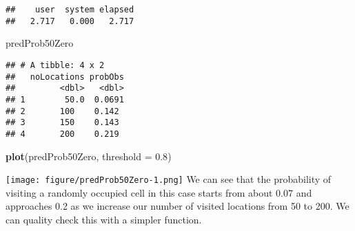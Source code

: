 \documentclass[]{article}
\newenvironment{Shaded}{\begin{snugshade}}{\end{snugshade}}
\newcommand{\KeywordTok}[1]{\textcolor[rgb]{0.13,0.29,0.53}{\textbf{#1}}}
\newcommand{\DataTypeTok}[1]{\textcolor[rgb]{0.13,0.29,0.53}{#1}}
\newcommand{\DecValTok}[1]{\textcolor[rgb]{0.00,0.00,0.81}{#1}}
\newcommand{\FloatTok}[1]{\textcolor[rgb]{0.00,0.00,0.81}{#1}}
\newcommand{\StringTok}[1]{\textcolor[rgb]{0.31,0.60,0.02}{#1}}
\newcommand{\CommentTok}[1]{\textcolor[rgb]{0.56,0.35,0.01}{\textit{#1}}}
\newcommand{\ControlFlowTok}[1]{\textcolor[rgb]{0.13,0.29,0.53}{\textbf{#1}}}
\newcommand{\OperatorTok}[1]{\textcolor[rgb]{0.81,0.36,0.00}{\textbf{#1}}}
\newcommand{\NormalTok}[1]{#1}
\begin{document}
\begin{verbatim}
##    user  system elapsed 
##   2.717   0.000   2.717
\end{verbatim}

\begin{Shaded}
\begin{Highlighting}[]
\NormalTok{predProb50Zero}
\end{Highlighting}
\end{Shaded}

\begin{verbatim}
## # A tibble: 4 x 2
##   noLocations probObs
##         <dbl>   <dbl>
## 1        50.0  0.0691
## 2       100    0.142 
## 3       150    0.143 
## 4       200    0.219
\end{verbatim}

\begin{Shaded}
\begin{Highlighting}[]
\KeywordTok{plot}\NormalTok{(predProb50Zero, }\DataTypeTok{threshold =} \FloatTok{0.8}\NormalTok{)}
\end{Highlighting}
\end{Shaded}

\texttt{[image: figure/predProb50Zero-1.png]} We can see that the
probability of visiting a randomly occupied cell in this case starts
from about 0.07 and approaches 0.2 as we increase our number of visited
locations from 50 to 200. We can quality check this with a simpler
function.

\begin{Shaded}
\end{Shaded}
\end{document}
